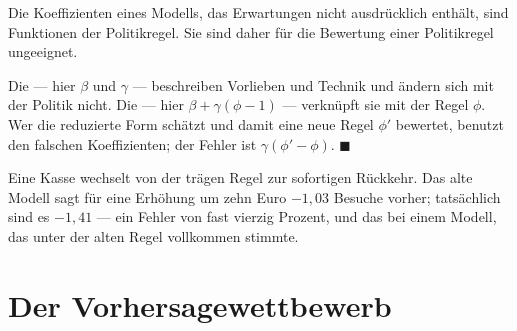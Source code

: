 \begin{merksatz}
Die Koeffizienten eines Modells, das Erwartungen nicht ausdrücklich enthält, sind Funktionen der Politikregel. Sie sind daher für die Bewertung einer  Politikregel ungeeignet.

Die  --- hier $\beta$ und $\gamma$ --- beschreiben Vorlieben und Technik und ändern sich mit der Politik nicht. Die  --- hier $\beta+\gamma(\phi-1)$ --- verknüpft sie mit der Regel $\phi$. Wer die reduzierte Form schätzt und damit eine neue Regel $\phi'$ bewertet, benutzt den falschen Koeffizienten; der Fehler ist $\gamma(\phi'-\phi)$. $\blacksquare$

Eine Kasse wechselt von der trägen Regel zur sofortigen Rückkehr. Das alte Modell sagt für eine Erhöhung um zehn Euro $-1{,}03$ Besuche vorher; tatsächlich sind es $-1{,}41$ --- ein Fehler von fast vierzig Prozent, und das bei einem Modell, das unter der alten Regel vollkommen stimmte.

\begin{center}
\begin{minipage}{0.88\textwidth}
\end{minipage}
\end{center}
\end{merksatz}

\section{Der Vorhersagewettbewerb}

